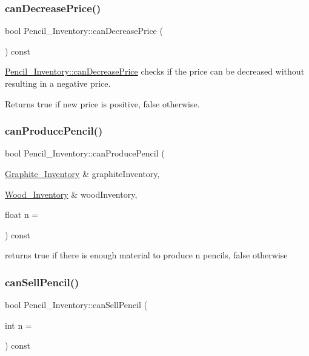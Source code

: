 \subsubsection{\texorpdfstring{canDecreasePrice()}{canDecreasePrice()}}
{\footnotesize\ttfamily bool Pencil\+\_\+\+Inventory\+::can\+Decrease\+Price (\begin{DoxyParamCaption}{ }\end{DoxyParamCaption}) const}



\mbox{\hyperlink{classPencil__Inventory_a5c8d580bd32a2ef4b2196da7570203bf}{Pencil\+\_\+\+Inventory\+::can\+Decrease\+Price}} checks if the price can be decreased without resulting in a negative price. 

\begin{DoxyReturn}{Returns}
true if new price is positive, false otherwise. 
\end{DoxyReturn}
\mbox{\label{classPencil__Inventory_a15f66581a83070557a53b94227e3d722}} 
\subsubsection{\texorpdfstring{canProducePencil()}{canProducePencil()}}
{\footnotesize\ttfamily bool Pencil\+\_\+\+Inventory\+::can\+Produce\+Pencil (\begin{DoxyParamCaption}\item[{\mbox{\hyperlink{classGraphite__Inventory}{Graphite\+\_\+\+Inventory}} \&}]{graphite\+Inventory,  }\item[{\mbox{\hyperlink{classWood__Inventory}{Wood\+\_\+\+Inventory}} \&}]{wood\+Inventory,  }\item[{float}]{n = {} }\end{DoxyParamCaption}) const}



returns true if there is enough material to produce n pencils, false otherwise 

\mbox{\label{classPencil__Inventory_ab8c12609e21dfd98269e6d4589b13a1c}} 
\subsubsection{\texorpdfstring{canSellPencil()}{canSellPencil()}}
{\footnotesize\ttfamily bool Pencil\+\_\+\+Inventory\+::can\+Sell\+Pencil (\begin{DoxyParamCaption}\item[{int}]{n = {} }\end{DoxyParamCaption}) const}



